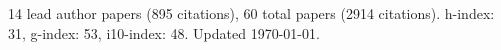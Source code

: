 14 lead author papers (895 citations),
60 total papers (2914 citations).\newline
h-index: 31, g-index: 53, i10-index: 48. Updated \today.
